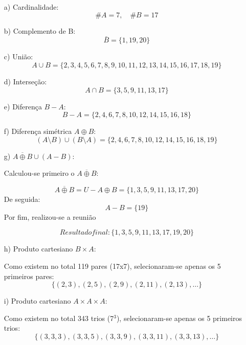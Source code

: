 \begin{enumerate}
    \item[a)] Cardinalidade:
    \[
    \#A = 7, \quad \#B = 17
    \]

    \item[b)] Complemento de B:
    \[
    \bar{B} = \{1, 19, 20\}
    \]
    \item[c)] União:
    \[
    A \cup B = \{2, 3, 4, 5, 6, 7, 8, 9, 10, 11, 12, 13, 14, 15, 16, 17, 18, 19\}
    \]

    \item[d)] Interseção:
    \[
    A \cap B = \{3, 5, 9, 11, 13, 17\}
    \]

    \item[e)] Diferença \(B - A\):
    \[
    B - A = \{2, 4, 6, 7, 8, 10, 12, 14, 15, 16, 18\}
    \]

    \item[f)] Diferença simétrica \(A \oplus B\):
    \[
    (A \setminus B) \cup (B \setminus A) = \{2, 4, 6, 7, 8, 10, 12, 14, 15, 16, 18, 19\}
    \]

    \item[g)] \(\overline{A \oplus {B}} \cup (A - B)\):

    Calculou-se primeiro o  $\overline{A \oplus B}$:

    \[
   \overline{A \oplus {B}} =U -  A \oplus {B} =\{1,3,5,9,11,13,17,20\}
    \]
De seguida:
    \[
    A - B = \{19\}
    \]
Por fim, realizou-se a reunião

    \[
    Resultado final: \{1,3,5,9,11,13,17,19,20\}
    \]

    \item[h)] Produto cartesiano \(B \times A\):

    Como existem no total 119 pares (17x7), selecionaram-se apenas os 5 primeiros pares:
    \[
    \{(2,3), (2,5), (2,9), (2,11), (2,13), \ldots\}
    \]

    \item[i)] Produto cartesiano \(A \times A \times A\):

      Como existem no total 343 trios (7$^{3}$), selecionaram-se apenas os 5 primeiros trios:
    \[
    \{(3,3,3), (3,3,5), (3,3,9), (3,3,11), (3,3,13), \ldots\}
    \]
\end{enumerate}

